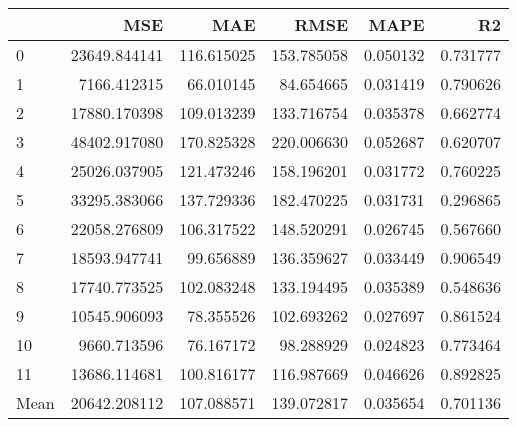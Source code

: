 \begin{tabular}{lrrrrr}
\toprule
 & MSE & MAE & RMSE & MAPE & R2 \\
\midrule
0 & 23649.844141 & 116.615025 & 153.785058 & 0.050132 & 0.731777 \\
1 & 7166.412315 & 66.010145 & 84.654665 & 0.031419 & 0.790626 \\
2 & 17880.170398 & 109.013239 & 133.716754 & 0.035378 & 0.662774 \\
3 & 48402.917080 & 170.825328 & 220.006630 & 0.052687 & 0.620707 \\
4 & 25026.037905 & 121.473246 & 158.196201 & 0.031772 & 0.760225 \\
5 & 33295.383066 & 137.729336 & 182.470225 & 0.031731 & 0.296865 \\
6 & 22058.276809 & 106.317522 & 148.520291 & 0.026745 & 0.567660 \\
7 & 18593.947741 & 99.656889 & 136.359627 & 0.033449 & 0.906549 \\
8 & 17740.773525 & 102.083248 & 133.194495 & 0.035389 & 0.548636 \\
9 & 10545.906093 & 78.355526 & 102.693262 & 0.027697 & 0.861524 \\
10 & 9660.713596 & 76.167172 & 98.288929 & 0.024823 & 0.773464 \\
11 & 13686.114681 & 100.816177 & 116.987669 & 0.046626 & 0.892825 \\
Mean & 20642.208112 & 107.088571 & 139.072817 & 0.035654 & 0.701136 \\
\bottomrule
\end{tabular}
